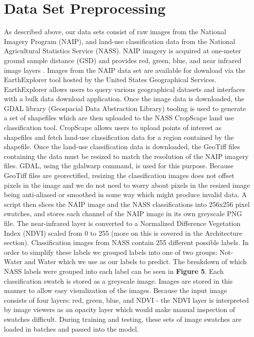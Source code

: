 \documentclass[12pt]{article}
\begin{document}
\section{Data Set Preprocessing}
As described above, our data sets consist of raw images from the National Imagery Program (NAIP), and land-use classification data from the National Agricultural Statistics Service (NASS). NAIP imagery is acquired at one-meter ground sample distance (GSD) and provides red, green, blue, and near infrared image layers \cite{NAIP}. Images from the NAIP data set are available for download via the EarthExplorer tool hosted by the United States Geographical Services. EarthExplorer allows users to query various geographical datasets and interfaces with a bulk data download application. Once the image data is downloaded, the GDAL library (Geospacial Data Abstraction Library) tooling is used to generate a set of shapefiles which are then uploaded to the NASS CropScape land use classification tool. CropScape allows users to upload points of interest as shapefiles and fetch land-use classification data for a region contained by the shapefile. Once the land-use classification data is downloaded, the GeoTiff files containing the data must be resized to match the resolution of the NAIP imagery files. GDAL, using the gdalwarp command, is used for this purpose. Because GeoTiff files are georectified, resizing the classification images does not offset pixels in the image and we do not need to worry about pixels in the resized image being anti-aliased or smoothed in some way which might produce invalid data. A script then slices the NAIP image and the NASS classifications into 256x256 pixel swatches, and stores each channel of the NAIP image in its own greyscale PNG file. The near-infrared layer is converted to a Normalized Difference Vegetation Index (NDVI) scaled from 0 to 255 (more on this is covered in the Architecture section). Classification images from NASS contain 255 different possible labels. In order to simplify these labels we grouped labels into one of two groups: Not-Water and Water which we use as our labels to predict. The breakdown of which NASS labels were grouped into each label can be seen in \textbf{Figure 5}. Each classification swatch is stored as a greyscale image. Images are stored in this manner to allow easy visualization of the images. Because the input image consists of four layers: red, green, blue, and NDVI - the NDVI layer is interpreted by image viewers as an opacity layer which would make manual inspection of swatches difficult. During training and testing, these sets of image swatches are loaded in batches and passed into the model.
\end{document}
